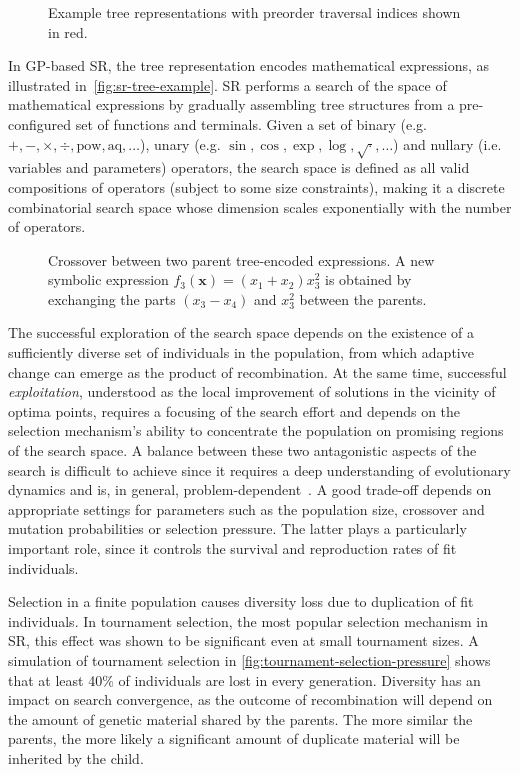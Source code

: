 \documentclass[openacc]{rstransa}%
\begin{document}
\begin{figure}
    \centering
    
    \caption{Example tree representations with preorder traversal indices shown in red.}
    \label{fig:sr-tree-example}
\end{figure}

In GP-based SR, the tree representation encodes mathematical expressions, as illustrated in~\autoref{fig:sr-tree-example}. SR performs a search of the space of mathematical expressions by gradually assembling tree structures from a pre-configured set of functions and terminals.
%
Given a set of binary (e.g. $+, -, \times, \div, \mathrm{pow}, \mathrm{aq}, \dots$), unary (e.g. $\sin, \cos, \exp, \log, \sqrt{\cdot}, \dots$) and nullary (i.e. variables and parameters) operators, the search space is defined as all valid compositions of operators (subject to some size constraints), making it a discrete combinatorial search space whose dimension scales exponentially with the number of operators.

\begin{figure}
    
    \caption{Crossover between two parent tree-encoded expressions. A new symbolic expression $f_3(\mathbf{x}) = (x_1 + x_2){x_3^2}$ is obtained by exchanging the parts $(x_3-x_4)$ and $x_3^2$ between the parents.}\label{fig:gp-crossover}
\end{figure}

The successful exploration of the search space depends on the existence of a sufficiently diverse set of individuals in the population, from which adaptive change can emerge as the product of recombination. At the same time, successful \textit{exploitation}, understood as the local improvement of solutions in the vicinity of optima points, requires a focusing of the search effort and depends on the selection mechanism's ability to concentrate the population on promising regions of the search space.
%
A balance between these two antagonistic aspects of the search is difficult to achieve since it requires a deep understanding of evolutionary dynamics and is, in general, problem-dependent~\cite{crepinsek2013}. A good trade-off depends on appropriate settings for parameters such as the population size, crossover and mutation probabilities or selection pressure. The latter plays a particularly important role, since it controls the survival and reproduction rates of fit individuals.

Selection in a finite population causes diversity loss due to duplication of fit individuals\cite{prugel-bennett2000}. In tournament selection, the most popular selection mechanism in SR, this effect was shown to be significant even at small tournament sizes\cite{xie2011}. A simulation of tournament selection in \autoref{fig:tournament-selection-pressure} shows that at least 40\% of individuals are lost in every generation.
%
Diversity has an impact on search convergence, as the outcome of recombination will depend on the amount of genetic material shared by the parents. The more similar the parents, the more likely a significant amount of duplicate material will be inherited by the child.
\end{document}

